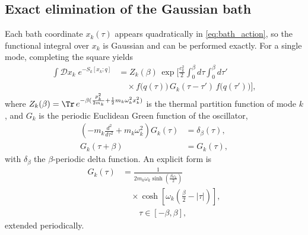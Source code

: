 \subsection{Exact elimination of the Gaussian bath}

Each bath coordinate $x_k(\tau)$ appears quadratically in \eqref{eq:bath_action},
so the functional integral over $x_k$ is Gaussian and can be performed exactly.
For a single mode, completing the square yields
\begin{equation}
\begin{split}
    \int \mathcal D x_k\; e^{-S_k[x_k;q]}
    &=
    Z_k(\beta)\,
    \exp\Bigg[
        \frac{c_k^2}{2}\int_0^\beta d\tau\int_0^\beta d\tau'\, \\
    &\quad \times
        f\!\big(q(\tau)\big)\,G_k(\tau-\tau')\,f\!\big(q(\tau')\big)
    \Bigg],
\end{split}
    \label{eq:single_mode_integrated}
\end{equation}
where $Z_k(\beta)=\Tr\,e^{-\beta(\frac{p_k^2}{2m_k}+\frac{1}{2}m_k\omega_k^2 x_k^2)}$
is the thermal partition function of mode $k$, and $G_k$ is the periodic Euclidean
Green function of the oscillator,
\begin{equation}
\begin{split}
    \left(-m_k\frac{d^2}{d\tau^2}+m_k\omega_k^2\right)G_k(\tau)
    &=\delta_\beta(\tau),\\
    G_k(\tau+\beta)&=G_k(\tau),
\end{split}
\end{equation}
with $\delta_\beta$ the $\beta$-periodic delta function. An explicit form is
\begin{equation}
\begin{split}
    G_k(\tau)
    &=
    \frac{1}{2m_k\omega_k \sinh\!\left(\frac{\beta\omega_k}{2}\right)} \\
    &\quad \times
    \cosh\!\left[\omega_k\left(\frac{\beta}{2}-|\tau|\right)\right],\\
    &\qquad \tau\in[-\beta,\beta],
\end{split}
    \label{eq:euclidean_green_function}
\end{equation}
extended periodically.


